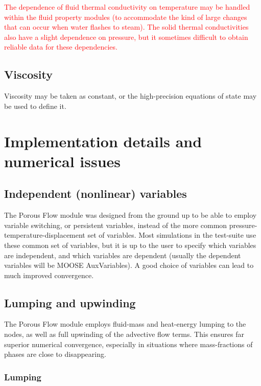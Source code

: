 \documentclass[12pt]{report}
\begin{document}
\textcolor{red}{The dependence of fluid thermal conductivity on temperature may be
handled within the fluid property modules (to accommodate
the kind of large changes that can occur when water flashes to
steam).}  \textcolor{red}{The solid thermal
conductivities also have a slight dependence on pressure, but it
sometimes difficult to obtain reliable data for these dependencies.}

\section{Viscosity}

Viscosity may be taken as constant, or the high-precision equations of
state may be used to define it.

\chapter{Implementation details and numerical issues}

\section{Independent (nonlinear) variables}

The Porous Flow module was designed from the ground up to be able to
employ variable switching, or persistent variables, instead of the
more common pressure-temperature-displacement set of variables.  Most
simulations in the test-suite use these common set of variables, but
it is up to the user to specify which variables are independent, and
which variables are dependent (usually the dependent variables will be
MOOSE AuxVariables).  A good choice of variables can lead to much
improved convergence.

\section{Lumping and upwinding}
\label{upwinding.and.lumping.sec}

The Porous Flow module employs fluid-mass and heat-energy lumping to
the nodes, as well as full upwinding of the advective flow terms.
This ensures far superior numerical convergence, especially in
situations where mass-fractions of phases are close to disappearing.

\subsection{Lumping}
\label{lumping.sec}
\end{document}
